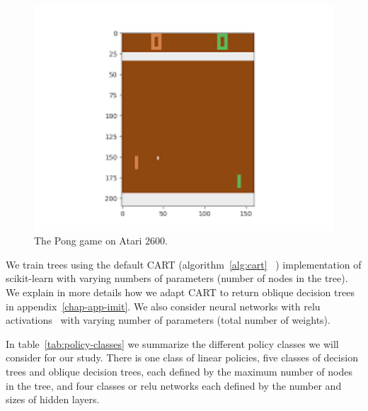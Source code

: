 \begin{figure}
\begin{minipage}{0.47\textwidth}
  \end{minipage}
  \hfill
  \begin{minipage}{0.47\textwidth}
  \includegraphics[width=1\textwidth]{images/images_part3/pong.png}
  \caption{The Pong game on Atari 2600.}\label{lst:generic-linear}
  \end{minipage}
  \end{figure}
We train trees using the default CART (algorithm~\ref{alg:cart} ~\cite{breiman1984classification}) implementation of scikit-learn with varying numbers of parameters (number of nodes in the tree).
We explain in more details how we adapt CART to return oblique decision trees in appendix~\ref{chap-app-imit}.
We also consider neural networks with relu activations~\cite{relunet} with varying number of parameters (total number of weights).

In table~\ref{tab:policy-classes} we summarize the different policy classes we will consider for our study.
There is one class of linear policies, five classes of decision trees and oblique decision trees, each defined by the maximum number of nodes in the tree, and four classes or relu networks each defined by the number and sizes of hidden layers.

